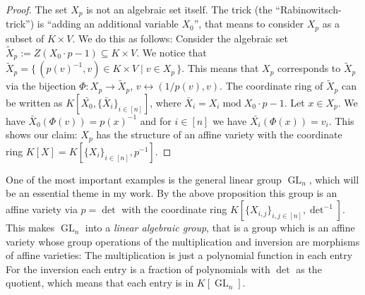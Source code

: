 \begin{proof}
  The set $X_p$ is not an algebraic set itself.
  The trick (the ``Rabinowitsch-trick'') is ``adding an additional variable $X_0$'', that means to consider $X_p$ as a subset of $K \times V$.
  We do this as follows:
  Consider the algebraic set $\tilde{X}_p := Z \left( X_0 \cdot p -1 \right) \subseteq K \times V$.
  We notice that $\tilde{X}_p = \{\, (p(v)^{-1},v) \in K \times V \mid v \in X_p \,\}$.
  This means that $X_p$ corresponds to $\tilde{X}_p$ via the bijection $\Phi \colon X_p \longrightarrow \tilde{X}_p$, $ v \leftrightarrow (1/p(v),v)$.
  The coordinate ring of $\tilde{X}_p$ can be written as $K[\bar{X_0}, \{\bar{X}_i\}_{i \in [n]}]$, where $\bar{X}_i = X_i \operatorname{mod} X_0 \cdot p -1$.
  Let $x \in X_p$.
  We have $\bar{X}_0 (\Phi(v)) = p(x)^{-1}$ and for $ i \in [n] $ we have $\bar{X_i}(\Phi(x)) = v_i$.
  This shows our claim: $X_p$ has the structure of an affine variety with the coordinate ring $K[X] = K[\{X_i\}_{i \in [n]}, p^{-1}]$.
\end{proof}

\begin{example}
  One of the most important examples is the general linear group $\operatorname{GL}_n$, which will be an essential theme in my work.
  By the above proposition this group is an affine variety via $p = \operatorname{det}$ with the coordinate ring $K[\{X_{i,j}\}_{i,j \in [n]}, \operatorname{det}^{-1}]$.
  This makes $\operatorname{GL}_n$ into a \textit{linear algebraic group}, that is a group which is an affine variety whose group operations of the multiplication and inversion are morphisms of affine varieties:
  The multiplication is just a polynomial function in each entry
  For the inversion each entry is a fraction of polynomials with $\operatorname{det}$ as the quotient, which means that each entry is in $K[\operatorname{GL}_n]$.
\end{example}


